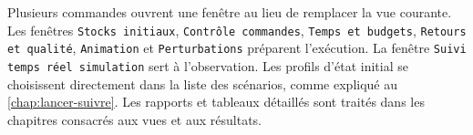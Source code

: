 Plusieurs commandes ouvrent une fenêtre au lieu de remplacer la vue courante. Les fenêtres \texttt{Stocks initiaux}, \texttt{Contrôle commandes}, \texttt{Temps et budgets}, \texttt{Retours et qualité}, \texttt{Animation} et \texttt{Perturbations} préparent l'exécution. La fenêtre \texttt{Suivi temps réel simulation} sert à l'observation. Les profils d'état initial se choisissent directement dans la liste des scénarios, comme expliqué au \cref{chap:lancer-suivre}. Les rapports et tableaux détaillés sont traités dans les chapitres consacrés aux vues et aux résultats.


